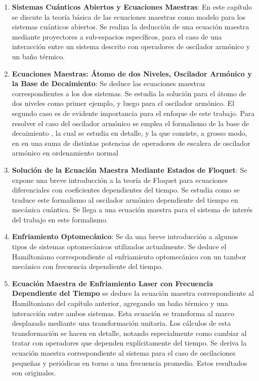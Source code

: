 \documentclass[a4paper,10pt]{report}
\begin{document}
\begin{enumerate}
\item \textbf{Sistemas Cuánticos Abiertos y Ecuaciones Maestras}: En este capítulo se discute la teoría básica de las ecuaciones maestras como modelo para los sistemas cuánticos abiertos. Se realiza la deducción de una ecuación maestra mediante proyectores a sub-espacios específicos, para el caso de una interacción entre un sistema descrito con operadores de oscilador armónico y un baño térmico. 

\item \textbf{Ecuaciones Maestras: Átomo de dos Niveles, Oscilador Armónico y la Base de Decaimiento}: Se deduce las ecuaciones maestras correspondientes a los dos sistemas. Se estudia la solución para el átomo de dos niveles como primer ejemplo, y luego para el oscilador armónico. El segundo caso es de evidente importancia para el enfoque de este trabajo. Para resolver el caso del oscilador armónico se emplea el formalismo de la base de decaimiento \cite{EnglertDB}, la cual se estudia en detalle, y la que consiste, a grosso modo, en en una suma de distintas potencias de operadores de escalera de oscilador armónico en ordenamiento normal

\item \textbf{Solución de la Ecuación Maestra Mediante Estados de Floquet}: Se expone una breve introducción a la teoría de Floquet para ecuaciones diferenciales con coeficientes dependientes del tiempo. Se estudia como se traduce este formalismo al oscilador armónico dependiente del tiempo en mecánica cuántica. Se llega a una ecuación maestra para el sistema de interés del trabajo en este formalismo.

\item \textbf{Enfriamiento Optomecánico}: Se da una breve introducción a algunos tipos de sistemas optomecánicos utilizados actualmente. Se deduce el Hamiltoniano correspondiente al enfriamiento optomecánico con un tambor mecánico con frecuencia dependiente del tiempo.

\item \textbf{Ecuación Maestra de Enfriamiento Laser con Frecuencia Dependiente del Tiempo} se deduce la ecuación maestra correspondiente al Hamiltoniano del capítulo anterior, agregando un baño térmico y una interacción entre ambos sistemas. Esta ecuación se transforma al marco desplazado mediante una transformación unitaria. Los cálculos de esta transformación se hacen en detalle, notando especialmente como cambiar al tratar con operadores que dependen explícitamente del tiempo. Se deriva la ecuación maestra correspondiente al sistema para el caso de oscilaciones pequeñas y periódicas en torno a una frecuencia promedio. Estos resultados son originales.


\end{enumerate}
\end{document}
